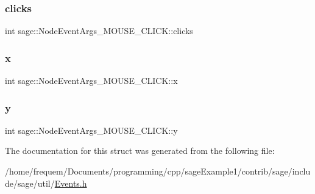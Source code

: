 \subsubsection{\texorpdfstring{clicks}{clicks}}
{\footnotesize\ttfamily int sage\+::\+Node\+Event\+Args\+\_\+\+M\+O\+U\+S\+E\+\_\+\+C\+L\+I\+C\+K\+::clicks}

\mbox{\label{structsage_1_1NodeEventArgs__MOUSE__CLICK_aea838091878c71fbf5e97adc9b6ecdef}} 
\subsubsection{\texorpdfstring{x}{x}}
{\footnotesize\ttfamily int sage\+::\+Node\+Event\+Args\+\_\+\+M\+O\+U\+S\+E\+\_\+\+C\+L\+I\+C\+K\+::x}

\mbox{\label{structsage_1_1NodeEventArgs__MOUSE__CLICK_a2b9eedb405244d16ecc269e565c7af20}} 
\subsubsection{\texorpdfstring{y}{y}}
{\footnotesize\ttfamily int sage\+::\+Node\+Event\+Args\+\_\+\+M\+O\+U\+S\+E\+\_\+\+C\+L\+I\+C\+K\+::y}



The documentation for this struct was generated from the following file\+:\begin{DoxyCompactItemize}
\item 
/home/frequem/\+Documents/programming/cpp/sage\+Example1/contrib/sage/include/sage/util/\mbox{\hyperlink{Events_8h}{Events.\+h}}\end{DoxyCompactItemize}
